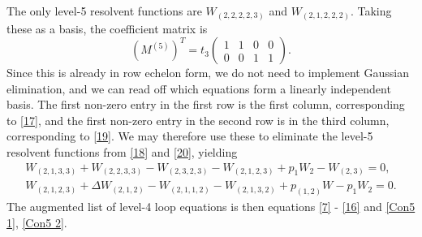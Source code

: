 The only level-5 resolvent functions are $W_{(2,2,2,2,3)}$ and $W_{(2,1,2,2,2)}$. Taking these as a
basis, the coefficient matrix is
%
\begin{equation}
    (M^{(5)})^T = t_3
    \begin{pmatrix}
        1 & 1 & 0 & 0 \\
        0 & 0 & 1 & 1
    \end{pmatrix}.
\end{equation}
%
Since this is already in row echelon form, we do not need to implement Gaussian elimination, and we
can read off which equations form a linearly independent basis. The first non-zero entry in the
first row is the first column, corresponding to \eqref{17}, and the first non-zero entry in the
second row is in the third column, corresponding to \eqref{19}. We may therefore use these to
eliminate the level-5 resolvent functions from \eqref{18} and \eqref{20}, yielding
%
\begin{align}
    \label{Con5 1}
    W_{(2,1,3,3)} + W_{(2,2,3,3)} - W_{(2,3,2,3)} - W_{(2,1,2,3)} + p_1 W_2 - W_{(2,3)} = 0, \\
    \label{Con5 2}
    W_{(2,1,2,3)} + \Delta W_{(2,1,2)} - W_{(2,1,1,2)} - W_{(2,1,3,2)} + p_{(1,2)}W - p_1 W_2 = 0.
\end{align}
%
The augmented list of level-4 loop equations is then equations \eqref{7} - \eqref{16} and
\eqref{Con5 1}, \eqref{Con5 2}.

